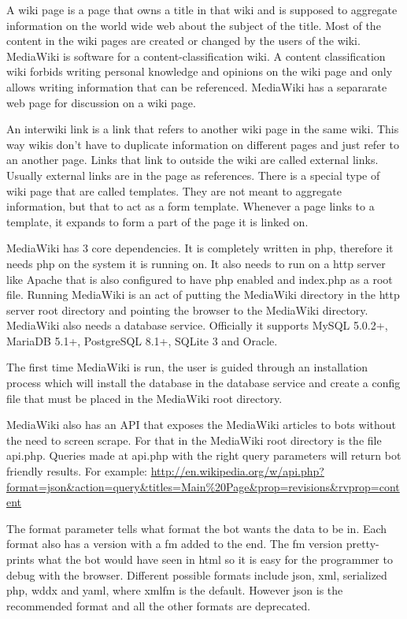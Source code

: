 A wiki page is a page that owns a title in that wiki and is supposed to aggregate information on the world wide web about the subject of the title. Most of the content in the wiki pages are created or changed by the users of the wiki. MediaWiki is software for a content-classification wiki. A content classification wiki forbids writing personal knowledge and opinions on the wiki page and only allows writing information that can be referenced. MediaWiki has a separarate web page for discussion on a wiki page.

An interwiki link is a link that refers to another wiki page in the same wiki. This way wikis don't have to duplicate information on different pages and just refer to an another page. Links that link to outside the wiki are called external links. Usually external links are in the page as references. There is a special type of wiki page that are called templates. They are not meant to aggregate information, but that to act as a form template. Whenever a page links to a template, it expands to form a part of the page it is linked on.

MediaWiki has 3 core dependencies. It is completely written in php, therefore it needs php on the system it is running on. It also needs to run on a http server like Apache that is also configured to have php enabled and index.php as a root file. Running MediaWiki is an act of putting the MediaWiki directory in the http server root directory and pointing the browser to the MediaWiki directory. MediaWiki also needs a database service. Officially it supports MySQL 5.0.2+, MariaDB 5.1+, PostgreSQL 8.1+, SQLite 3 and Oracle.

The first time MediaWiki is run, the user is guided through an installation process which will install the database in the database service and create a config file that must be placed in the MediaWiki root directory.

MediaWiki also has an API that exposes the MediaWiki articles to bots without the need to screen scrape. For that in the MediaWiki root directory is the file api.php. Queries made at api.php with the right query parameters will return bot friendly results. For example:
\url{http://en.wikipedia.org/w/api.php?format=json&action=query&titles=Main%20Page&prop=revisions&rvprop=content}

The format parameter tells what format the bot wants the data to be in. Each format also has a version with a fm added to the end. The fm version pretty-prints what the bot would have seen in html so it is easy for the programmer to debug with the browser. Different possible formats include json, xml, serialized php, wddx and yaml, where xmlfm is the default. However json is the recommended format and all the other formats are deprecated.

